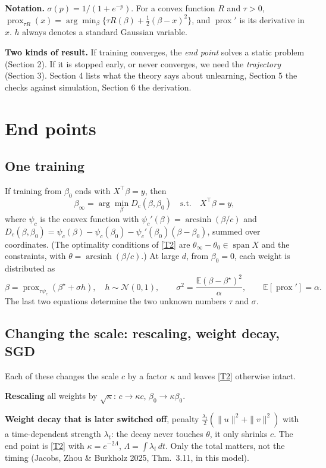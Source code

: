 \documentclass[10pt]{article}
\newcommand{\bs}{\beta^\star}\newcommand{\E}{\mathbb E}\newcommand{\asinh}{\operatorname{arcsinh}}\newcommand{\prox}{\operatorname{prox}}
\begin{document}
\textbf{Notation.} $\sigma(p)=1/(1+e^{-p})$. For a convex function $R$ and $\tau>0$, $\prox_{\tau R}(x)=\arg\min_\beta\{\tau R(\beta)+\frac12(\beta-x)^2\}$, and $\prox{}'$ is its derivative in $x$. $h$ always denotes a standard Gaussian variable.

\textbf{Two kinds of result.} If training converges, the \emph{end point} solves a static problem (Section 2). If it is stopped early, or never converges, we need the \emph{trajectory} (Section 3). Section 4 lists what the theory says about unlearning, Section 5 the checks against simulation, Section 6 the derivation.

\section{End points}
\subsection{One training}
If training from $\beta_0$ ends with $X^\top\beta=y$, then
\begin{equation}\label{T2}
\beta_\infty=\arg\min_\beta D_c(\beta,\beta_0)\quad\text{s.t.}\quad X^\top\beta=y ,
\end{equation}
where $\psi_c$ is the convex function with $\psi_c'(\beta)=\asinh(\beta/c)$ and $D_c(\beta,\beta_0)=\psi_c(\beta)-\psi_c(\beta_0)-\psi_c'(\beta_0)(\beta-\beta_0)$, summed over coordinates. (The optimality conditions of \eqref{T2} are $\theta_\infty-\theta_0\in\operatorname{span}X$ and the constraints, with $\theta=\asinh(\beta/c)$.) At large $d$, from $\beta_0=0$, each weight is distributed as
\begin{equation}\label{T3}
\beta=\prox_{\tau\psi_c}(\bs+\sigma h),\quad h\sim\mathcal N(0,1),\qquad \sigma^2=\frac{\E(\beta-\bs)^2}{\alpha},\qquad \E[\prox{}']=\alpha .
\end{equation}
The last two equations determine the two unknown numbers $\tau$ and $\sigma$.

\subsection{Changing the scale: rescaling, weight decay, SGD}
Each of these changes the scale $c$ by a factor $\kappa$ and leaves \eqref{T2} otherwise intact.

\textbf{Rescaling} all weights by $\sqrt\kappa$: $c\to\kappa c$, $\beta_0\to\kappa\beta_0$.

\textbf{Weight decay that is later switched off}, penalty $\frac{\lambda_t}2(\|u\|^2+\|v\|^2)$ with a time-dependent strength $\lambda_t$: the decay never touches $\theta$, it only shrinks $c$. The end point is \eqref{T2} with $\kappa=e^{-2\Lambda}$, $\Lambda=\int\lambda_t\,dt$. Only the total matters, not the timing (Jacobs, Zhou \& Burkholz 2025, Thm.\ 3.11, in this model).
\end{document}
